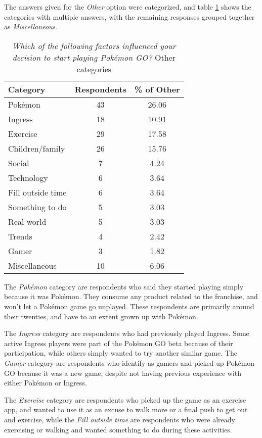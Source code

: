 The answers given for the \emph{Other} option were categorized, and table \ref{tbl:initial-interest-other-categories} shows the categories with multiple answers, with the remaining responses grouped together as \emph{Miscellaneous}.

\begin{table}[h]
	\caption{\emph{Which of the following factors influenced your decision to start playing Pokémon GO?} Other categories}
	\centering
	\label{tbl:initial-interest-other-categories}
	\begin{tabular}{|l|c|c|}
		\hline
		\textbf{Category} & \textbf{Respondents} & \textbf{\% of Other}\\
		\hline\hline
		Pokémon & 43 & 26.06\\\hline
		Ingress & 18 & 10.91\\\hline
		Exercise & 29 & 17.58\\\hline
		Children/family & 26 & 15.76\\\hline
		Social & 7 & 4.24\\\hline
		Technology & 6 & 3.64\\\hline
		Fill outside time & 6 & 3.64\\\hline
		Something to do & 5 & 3.03\\\hline
		Real world & 5 & 3.03\\\hline
		Trends & 4 & 2.42\\\hline
		Gamer & 3 & 1.82\\\hline
		Miscellaneous & 10 & 6.06\\\hline
	\end{tabular}
\end{table}

The \emph{Pokémon} category are respondents who said they started playing simply because it was Pokémon. They consume any product related to the franchise, and won't let a Pokémon game go unplayed. These respondents are primarily around their twenties, and have to an extent grown up with Pokémon.

The \emph{Ingress} category are respondents who had previously played Ingress. Some active Ingress players were part of the Pokémon GO beta because of their participation, while others simply wanted to try another similar game. The \emph{Gamer} category are respondents who identify as gamers and picked up Pokémon GO because it was a new game, despite not having previous experience with either Pokémon or Ingress.

The \emph{Exercise} category are respondents who picked up the game as an exercise app, and wanted to use it as an excuse to walk more or a final push to get out and exercise, while the \emph{Fill outside time} are respondents who were already exercising or walking and wanted something to do during these activities.

